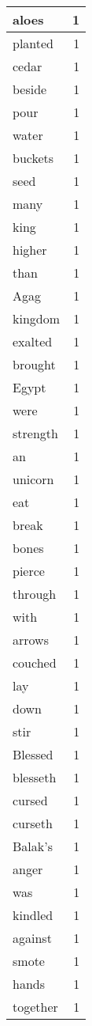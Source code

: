 \begin{center}
\begin{longtable}{l|r}
aloes & 1\\ \hline 
planted & 1\\ \hline 
cedar & 1\\ \hline 
beside & 1\\ \hline 
pour & 1\\ \hline 
water & 1\\ \hline 
buckets & 1\\ \hline 
seed & 1\\ \hline 
many & 1\\ \hline 
king & 1\\ \hline 
higher & 1\\ \hline 
than & 1\\ \hline 
Agag & 1\\ \hline 
kingdom & 1\\ \hline 
exalted & 1\\ \hline 
brought & 1\\ \hline 
Egypt & 1\\ \hline 
were & 1\\ \hline 
strength & 1\\ \hline 
an & 1\\ \hline 
unicorn & 1\\ \hline 
eat & 1\\ \hline 
break & 1\\ \hline 
bones & 1\\ \hline 
pierce & 1\\ \hline 
through & 1\\ \hline 
with & 1\\ \hline 
arrows & 1\\ \hline 
couched & 1\\ \hline 
lay & 1\\ \hline 
down & 1\\ \hline 
stir & 1\\ \hline 
Blessed & 1\\ \hline 
blesseth & 1\\ \hline 
cursed & 1\\ \hline 
curseth & 1\\ \hline 
Balak's & 1\\ \hline 
anger & 1\\ \hline 
was & 1\\ \hline 
kindled & 1\\ \hline 
against & 1\\ \hline 
smote & 1\\ \hline 
hands & 1\\ \hline 
together & 1\\ \hline 

\end{longtable}
\end{center}
